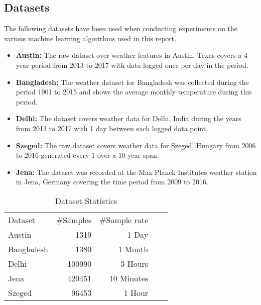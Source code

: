 \label{sec:ExpRes}
\subsection{Datasets}
The following datasets have been used when conducting experiments on the various machine learning algorithms used in this report.
\begin{itemize}
    \item \textbf{Austin:} The raw dataset over weather features in Austin, Texas covers a 4 year period from 2013 to 2017 with data logged once per day in the period.
    \item \textbf{Bangladesh:} The weather dataset for Bangladesh was collected during the period 1901 to 2015 and shows the average monthly temperature during this period. 
    \item \textbf{Delhi:} The dataset covers weather data for Delhi, India during the years from 2013 to 2017 with 1 day between each logged data point.
    \item \textbf{Szeged:} The raw dataset covers weather data for Szeged, Hungary from 2006 to 2016 generated every 1 over a 10 year span.
    \item \textbf{Jena:} The dataset was recorded at the Max Planck Institutes weather station in Jena, Germany covering the time period from 2009 to 2016.
\end{itemize}

\begin{table}[!ht]
\centering
\caption {Dataset Statistics} \label{tab:DatasetTable}
\begin{tabular}{|l|r|r|ll}
\cline{1-3}
Dataset    & \multicolumn{1}{l|}{\#Samples} & \multicolumn{1}{l|}{\#Sample rate} &  &  \\ \cline{1-3}
Austin     & 1319                           & 1 Day                              &  &  \\ \cline{1-3}
Bangladesh & 1380                           & 1 Month                            &  &  \\ \cline{1-3}
Delhi      & 100990                         & 3 Hours                            &  &  \\ \cline{1-3}
Jena       & 420451                         & 10 Minutes                         &  &  \\ \cline{1-3}
Szeged     & 96453                          & 1 Hour                             &  &  \\ \cline{1-3}
\end{tabular}
\end{table}

